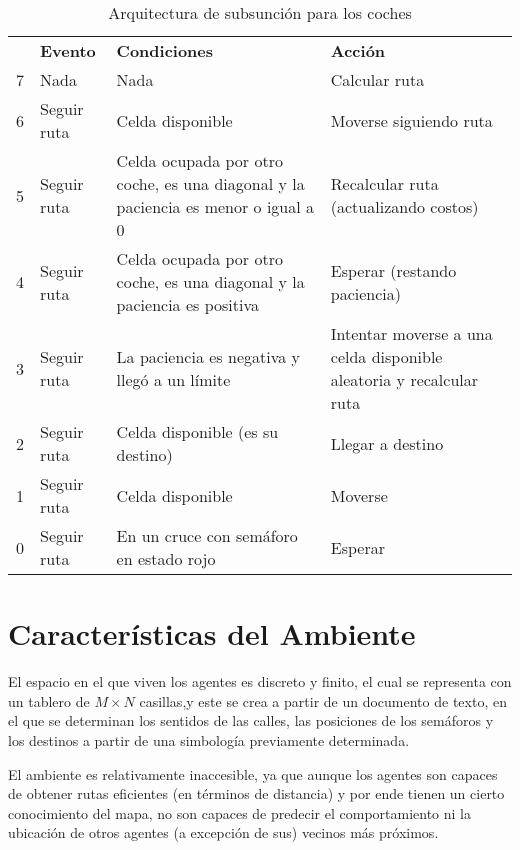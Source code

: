 \documentclass[twoside,11pt]{article}
\begin{document}
\begin{table}[ht]
    \centering
    \begin{tabular}{c| >{\raggedright}p{} >{\raggedright}p{} >{\raggedright\arraybackslash}p{}|}
    \cline{2-4}
      & \textbf{Evento} & \textbf{Condiciones} & \textbf{Acción} \\\cline{2-4}
     7 & Nada & Nada & Calcular ruta \\\cline{2-4}
     6 & Seguir ruta & Celda disponible & Moverse siguiendo ruta\\\cline{2-4}
     5 & Seguir ruta & Celda ocupada por otro coche, es una diagonal y la paciencia es menor o igual a 0 & Recalcular ruta (actualizando costos)\\\cline{2-4}
     4 & Seguir ruta & Celda ocupada por otro coche, es una diagonal y la paciencia es positiva & Esperar (restando paciencia)\\\cline{2-4}
     3 & Seguir ruta & La paciencia es negativa y llegó a un límite & Intentar moverse a una celda disponible aleatoria y recalcular ruta\\\cline{2-4}
     2 & Seguir ruta & Celda disponible (es su destino)  & Llegar a destino\\\cline{2-4}
     1 & Seguir ruta & Celda disponible  & Moverse\\\cline{2-4}
     0 & Seguir ruta & En un cruce con semáforo en estado rojo & Esperar \\\cline{2-4}
    \end{tabular}
    \caption{Arquitectura de subsunción para los coches}
    \label{tab:arch}
\end{table}

\section{Características del Ambiente}
El espacio en el que viven los agentes es discreto y finito, el cual se representa con un 
tablero de $M\times N$ casillas,y este se crea a partir de un documento de texto, en el 
que se determinan los sentidos de las calles, las posiciones de los semáforos y los destinos
a partir de una simbología previamente determinada. 

El ambiente es relativamente inaccesible, ya que aunque los agentes son capaces de obtener
rutas eficientes (en términos de distancia) y por ende tienen un cierto conocimiento del mapa,
no son capaces de predecir el comportamiento ni la ubicación de otros agentes (a excepción de sus)
vecinos más próximos. 
\end{document}
